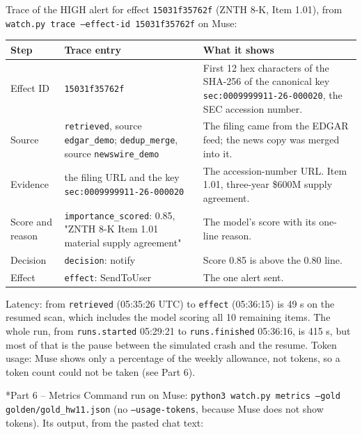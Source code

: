 \documentclass[11pt]{article}
\makeatletter
\renewcommand\section{\@startsection{section}{1}{\z@}{-3.0ex \@plus -1ex \@minus -.2ex}{1.2ex \@plus.2ex}{\normalfont\fontsize{14}{17}\selectfont\bfseries}}
\makeatother
\begin{document}
Trace of the HIGH alert for effect \texttt{15031f35762f} (ZNTH 8-K, Item 1.01), from \texttt{watch.py trace --effect-id 15031f35762f} on Muse:

\begin{center}
{\footnotesize\setlength{\tabcolsep}{3pt}
\begin{tabular}{>{\raggedright\arraybackslash}p{0.8in}>{\raggedright\arraybackslash}p{2.4in}>{\raggedright\arraybackslash}p{3.1in}}
\toprule
\textbf{Step} & \textbf{Trace entry} & \textbf{What it shows} \\
\midrule
Effect ID & \texttt{15031f35762f} & First 12 hex characters of the SHA-256 of the canonical key \texttt{sec:\allowbreak{}0009999911-26-000020}, the SEC accession number. \\
Source & \texttt{retrieved}, source \texttt{edgar\_\allowbreak{}demo}; \texttt{dedup\_\allowbreak{}merge}, source \texttt{newswire\_\allowbreak{}demo} & The filing came from the EDGAR feed; the news copy was merged into it. \\
Evidence & the filing URL and the key \texttt{sec:\allowbreak{}0009999911-26-000020} & The accession-number URL. Item 1.01, three-year \$600M supply agreement. \\
Score and reason & \texttt{importance\_\allowbreak{}scored}: 0.85, "ZNTH 8-K Item 1.01 material supply agreement" & The model's score with its one-line reason. \\
Decision & \texttt{decision}: notify & Score 0.85 is above the 0.80 line. \\
Effect & \texttt{effect}: SendToUser & The one alert sent. \\
\bottomrule
\end{tabular}}
\end{center}
Latency: from \texttt{retrieved} (05:35:26 UTC) to \texttt{effect} (05:36:15) is 49 s on the resumed scan, which includes the model scoring all 10 remaining items. The whole run, from \texttt{runs.started} 05:29:21 to \texttt{runs.finished} 05:36:16, is 415 s, but most of that is the pause between the simulated crash and the resume. Token usage: Muse shows only a percentage of the weekly allowance, not tokens, so a token count could not be taken (see Part 6).

\section*{Part 6 -- Metrics}
Command run on Muse: \texttt{python3 watch.py metrics --gold golden/\allowbreak{}gold\_\allowbreak{}hw11.json} (no \texttt{--usage-tokens}, because Muse does not show tokens). Its output, from the pasted chat text:
\end{document}
